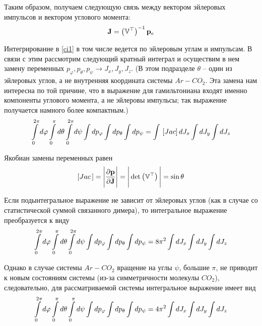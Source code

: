 Таким образом, получаем следующую связь между вектором эйлеровых импульсов и вектором углового момента:
\vverh
\begin{gather}
	\mathbf{J} = \left( \mathbb{V}^\top \right)^{-1} \mathbf{p}_e \notag
\end{gather}

Интегрирование в \eqref{ci1} в том числе ведется по эйлеровым углам и импульсам. В связи с этим рассмотрим следующий кратный интеграл и осуществим в нем замену переменных $p_\varphi, p_\theta, p_\psi \longrightarrow J_x, J_y, J_z$. (В этом подразделе $\theta$ -- один из эйлеровых углов, а не внутренняя координата системы $Ar-CO_2$. Эта замена нам интересна по той причине, что в выражение для гамильтониана входят именно компоненты углового момента, а не эйлеровы импульсы; так выражение получается намного более компактным.)
\vverh
\begin{gather}
	\int\limits_{0}^{2 \pi} d \varphi \int\limits_{0}^{\pi} d \theta \int\limits_{0}^{2 \pi} d \psi \int d p_\varphi \int d p_\theta \int d p_\psi = \int \, \left[ Jac \right] d J_x \int d J_y \int d J_z \notag
\end{gather}

Якобиан замены переменных равен
\vverh
\begin{gather}
	\left[ Jac \, \right] = \Bigg{|} \frac{\partial \mathbf{p}}{\partial \mathbf{J}} \Bigg{|} = \Bigg{|} \det \left( \mathbb{V}^\top \right) \Bigg{|} = \sin \theta \notag
\end{gather}

Если подынтегральное выражение не зависит от эйлеровых углов (как в случае со статистической суммой связанного димера), то интегральное выражение преобразуется к виду
\vverh
\begin{gather}
	\int\limits_{0}^{2 \pi} d \varphi \int\limits_{0}^{\pi} d \theta \int\limits_{0}^{2 \pi} d \psi \int d p_\varphi \int d p_\theta \int d p_\psi = 8 \pi^2 \int d J_x \int d J_y \int d J_z \notag 
\end{gather}

Однако в случае системы $Ar-CO_2$ вращение на углы $\psi$, большие $\pi$, не приводит к новым состояниям системы (из-за симметричности молекулы $CO_2$), следовательно, для рассматриваемой системы интегральное выражение имеет вид
\vverh
\begin{gather}
	\int\limits_{0}^{2 \pi} d \varphi \int\limits_{0}^{\pi} d \theta \int\limits_{0}^{\pi} d \psi \int d p_\varphi \int d p_\theta \int d p_\psi = 4 \pi^2 \int d J_x \int d J_y \int d J_z \notag 
\end{gather}

